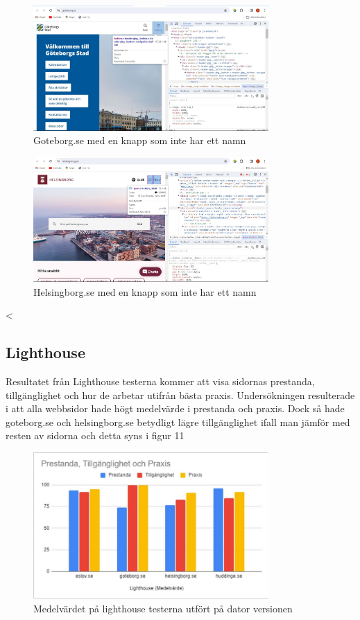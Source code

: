 \documentclass[11p]{article}
\begin{document}
    \begin{figure}[hbt!]
        \includegraphics[width=0.8\textwidth]{../images/Goteborg253.jpg}
        \caption{ Goteborg.se med en knapp som inte har ett namn }
    \end{figure}

    \begin{figure}[hbt!]
        \includegraphics[width=0.8\textwidth]{../images/Helsingborg253.jpg}
        \caption{ Helsingborg.se med en knapp som inte har ett namn }
    \end{figure}
<
    \subsection{Lighthouse}

    Resultatet från Lighthouse testerna kommer att visa sidornas prestanda, tillgänglighet och hur de arbetar utifrån bästa praxis.
    Undersökningen resulterade i att alla webbsidor hade högt medelvärde i prestanda och praxis.
    Dock så hade goteborg.se och helsingborg.se betydligt lägre tillgänglighet ifall man jämför med resten av sidorna och detta syns i figur 11

    \begin{figure}[hbt!]
        \includegraphics[width=0.8\textwidth]{../images/Medelvarde.jpg}
        \caption{ Medelvärdet på lighthouse testerna utfört på dator versionen }
    \end{figure}
\end{document}
